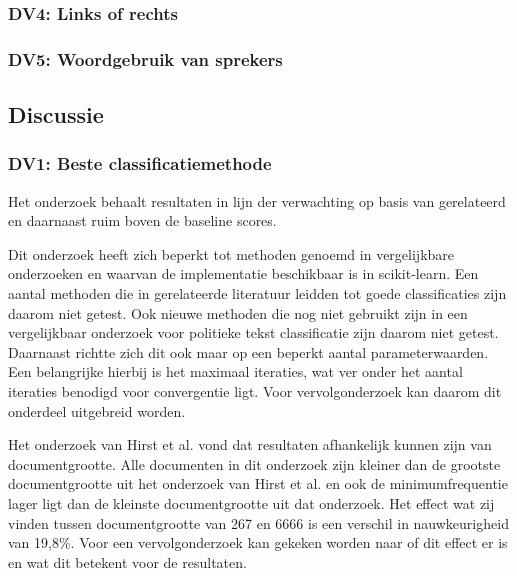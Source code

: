 \subsubsection{DV4: Links of rechts}

\subsubsection{DV5: Woordgebruik van sprekers}

\subsection{Discussie}
\subsubsection{DV1: Beste classificatiemethode}
Het onderzoek behaalt resultaten in lijn der verwachting op basis van gerelateerd en daarnaast ruim boven de baseline scores.\par
Dit onderzoek heeft zich beperkt tot methoden genoemd in vergelijkbare onderzoeken en waarvan de implementatie beschikbaar is in scikit-learn. Een aantal methoden die in gerelateerde literatuur leidden tot goede classificaties zijn daarom niet getest. Ook nieuwe methoden die nog niet gebruikt zijn in een vergelijkbaar onderzoek voor politieke tekst classificatie zijn daarom niet getest. Daarnaast richtte zich dit ook maar op een beperkt aantal parameterwaarden. Een belangrijke hierbij is het maximaal iteraties, wat ver onder het aantal iteraties benodigd voor convergentie ligt. Voor vervolgonderzoek kan daarom dit onderdeel uitgebreid worden.\par
Het onderzoek van Hirst et al. vond dat resultaten afhankelijk kunnen zijn van documentgrootte. Alle documenten in dit onderzoek zijn kleiner dan de grootste documentgrootte uit het onderzoek van Hirst et al. en ook de minimumfrequentie lager ligt dan de kleinste documentgrootte uit dat onderzoek.
Het effect wat zij vinden tussen documentgrootte van 267 en 6666 is een verschil in nauwkeurigheid van 19,8\%. Voor een vervolgonderzoek kan gekeken worden naar of dit effect er is en wat dit betekent voor de resultaten.\par

